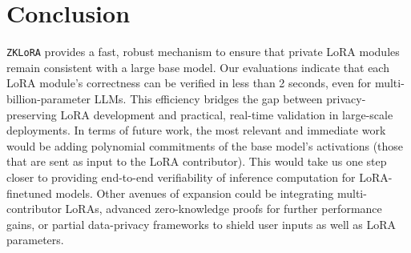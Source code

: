 \documentclass[11pt]{article}
\begin{document}
\section{Conclusion}

\texttt{ZKLoRA} provides a fast, robust mechanism to ensure that private LoRA modules remain consistent with a large base model. Our evaluations indicate that each LoRA module’s correctness can be verified in less than 2 seconds, even for multi-billion-parameter LLMs. This efficiency bridges the gap between privacy-preserving LoRA development and practical, real-time validation in large-scale deployments. In terms of future work, the most relevant and immediate work would be adding polynomial commitments of the base model's activations (those that are sent as input to the LoRA contributor). This would take us one step closer to providing end-to-end verifiability of inference computation for LoRA-finetuned models.  Other avenues of expansion could be integrating multi-contributor LoRAs, advanced zero-knowledge proofs for further performance gains, or partial data-privacy frameworks to shield user inputs as well as LoRA parameters. 



\end{document}
